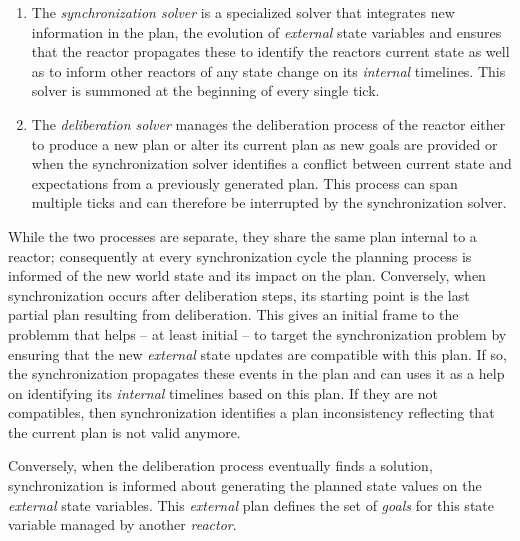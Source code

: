 \begin{enumerate}

\item The \emph{synchronization solver} is a specialized \eu solver
  that integrates new information in the plan, the evolution of
  \emph{external} state variables and ensures that the reactor
  propagates these to identify the reactors current state as well as
  to inform other reactors of any state change on its \emph{internal}
  timelines. This solver is summoned at the beginning of every single
  tick.

\item The \emph{deliberation solver} manages the deliberation process
  of the reactor either to produce a new plan or alter its current
  plan as new goals are provided or when the synchronization solver
  identifies a conflict between current state and expectations from a
  previously generated plan. This process can span multiple ticks and
  can therefore be interrupted by the synchronization solver.

\end{enumerate}

While the two processes are separate, they share the same plan
internal to a reactor; consequently at every synchronization cycle the
planning process is informed of the new world state and its impact on
the plan. Conversely, when synchronization occurs after deliberation
steps, its starting point is the last partial plan resulting from
deliberation. This gives an initial frame to the problemm that helps
-- at least initial -- to target the synchronization problem by
ensuring that the new {\em external} state updates are compatible with
this plan. If so, the synchronization propagates these events in the
plan and can uses it as a help on identifying its {\em internal}
timelines based on this plan. If they are not compatibles, then
synchronization identifies a plan inconsistency  reflecting that the
current plan is not valid anymore. 

 Conversely, when the deliberation process eventually finds a
solution, synchronization is informed about generating the planned
state values  on the {\em external} state
variables. This {\em external} plan defines the set of {\em goals} for
this state variable managed by another {\em reactor}.

